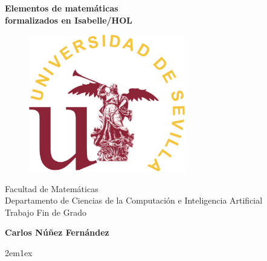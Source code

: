 \documentclass[12pt,a4paper,twoside]{book}
\begin{document}

\begin{titlepage}
 \vspace*{2cm}
  \begin{center}
    {\huge \textbf{Elementos de matemáticas \\ \vspace*{1em}
                   formalizados en Isabelle/HOL}}
  \end{center}
  \vspace{3cm}
  \begin{center}
    \begin{figure}[h]
    \centering
    \includegraphics[height=6cm]{sello.png}
    \end{figure}
  \vspace{3cm}
    {\normalsize Facultad de Matemáticas} \\
    {\normalsize Departamento de Ciencias de la Computación e Inteligencia Artificial}\\
    {\normalsize Trabajo Fin de Grado} \\
  \end{center}
  \begin{center}
    {\large \textbf{Carlos Núñez Fernández}}
  \end{center}
\end{titlepage}

\newpage


\tableofcontents

\parindent 2em\parskip 1ex

% 
\end{document}
